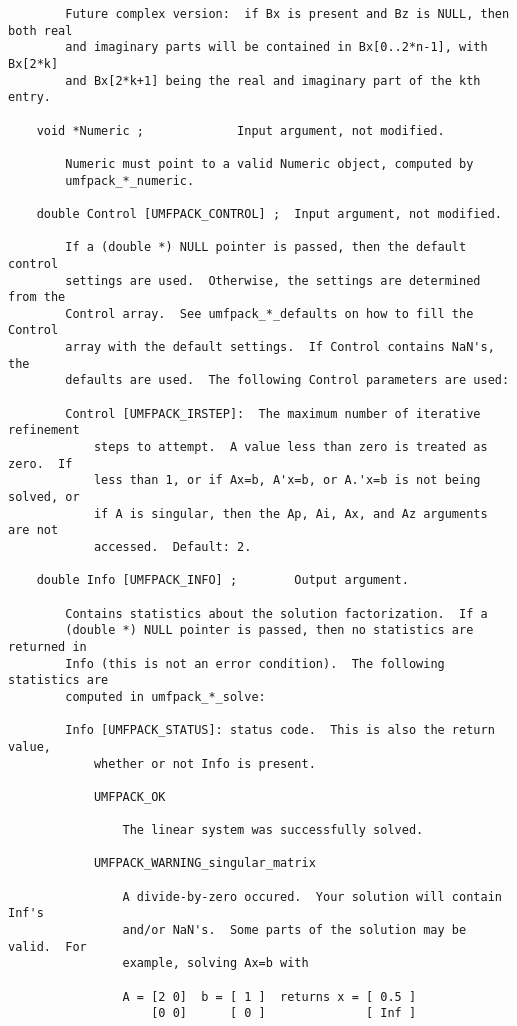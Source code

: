 {\begin{verbatim}
        Future complex version:  if Bx is present and Bz is NULL, then both real
        and imaginary parts will be contained in Bx[0..2*n-1], with Bx[2*k]
        and Bx[2*k+1] being the real and imaginary part of the kth entry.

    void *Numeric ;             Input argument, not modified.

        Numeric must point to a valid Numeric object, computed by
        umfpack_*_numeric.

    double Control [UMFPACK_CONTROL] ;  Input argument, not modified.

        If a (double *) NULL pointer is passed, then the default control
        settings are used.  Otherwise, the settings are determined from the
        Control array.  See umfpack_*_defaults on how to fill the Control
        array with the default settings.  If Control contains NaN's, the
        defaults are used.  The following Control parameters are used:

        Control [UMFPACK_IRSTEP]:  The maximum number of iterative refinement
            steps to attempt.  A value less than zero is treated as zero.  If
            less than 1, or if Ax=b, A'x=b, or A.'x=b is not being solved, or
            if A is singular, then the Ap, Ai, Ax, and Az arguments are not
            accessed.  Default: 2.

    double Info [UMFPACK_INFO] ;        Output argument.

        Contains statistics about the solution factorization.  If a
        (double *) NULL pointer is passed, then no statistics are returned in
        Info (this is not an error condition).  The following statistics are
        computed in umfpack_*_solve:

        Info [UMFPACK_STATUS]: status code.  This is also the return value,
            whether or not Info is present.

            UMFPACK_OK

                The linear system was successfully solved.

            UMFPACK_WARNING_singular_matrix

                A divide-by-zero occured.  Your solution will contain Inf's
                and/or NaN's.  Some parts of the solution may be valid.  For
                example, solving Ax=b with

                A = [2 0]  b = [ 1 ]  returns x = [ 0.5 ]
                    [0 0]      [ 0 ]              [ Inf ]


\end{verbatim}}
